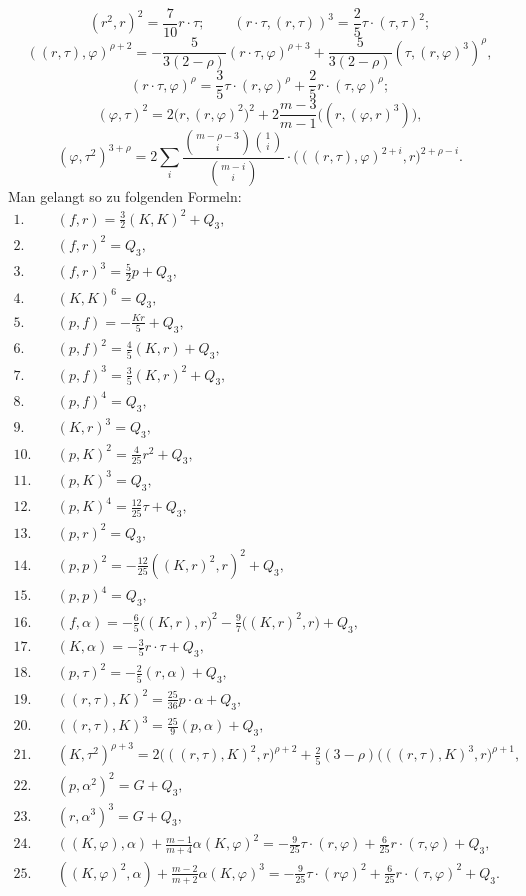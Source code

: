 \documentclass[10pt]{article}
\begin{document}
\[
(r^2,r)^2=\frac7{10}r\cdot\tau;
\qquad (r\cdot\tau,(r,\tau))^3=\frac25\tau\cdot(\tau,\tau)^2;
\]
\[
((r,\tau),\varphi)^{\rho+2}=-\frac5{3(2-\rho)}(r\cdot\tau,\varphi)^{\rho+3}+\frac5{3(2-\rho)}(\tau,(r,\varphi)^3)^\rho,
\]
\[
(r\cdot\tau,\varphi)^\rho=\frac35\tau\cdot(r,\varphi)^\rho+\frac25r\cdot(\tau,\varphi)^\rho;
\]
\[
(\varphi,\tau)^2=2\bigl(r,(r,\varphi)^2\bigr)^2+2\frac{m-3}{m-1}\bigl((r,(\varphi,r)^3)\bigr),
\]
\[
(\varphi,\tau^2)^{3+\rho}=2\sum_i\frac{\binom{m-\rho-3}{i}\binom{1}{i}}{\binom{m-i}{i}}\cdot\bigl(((r,\tau),\varphi)^{2+i},r\bigr)^{2+\rho-i}.
\]
Man gelangt so zu folgenden Formeln:
\begin{align*}
1.\quad &(f,r)=\frac32(K,K)^2+Q_3,\\
2.\quad &(f,r)^2=Q_3,\\
3.\quad &(f,r)^3=\frac52p+Q_3,\\
4.\quad &(K,K)^6=Q_3,\\
5.\quad &(p,f)=-\frac{Kr}{5}+Q_3,\\
6.\quad &(p,f)^2=\frac45(K,r)+Q_3,\\
7.\quad &(p,f)^3=\frac35(K,r)^2+Q_3,\\
8.\quad &(p,f)^4=Q_3,\\
9.\quad &(K,r)^3=Q_3,\\
10.\quad &(p,K)^2=\frac4{25}r^2+Q_3,\\
11.\quad &(p,K)^3=Q_3,\\
12.\quad &(p,K)^4=\frac{12}{25}\tau+Q_3,\\
13.\quad &(p,r)^2=Q_3,\\
14.\quad &(p,p)^2=-\frac{12}{25}((K,r)^2,r)^2+Q_3,\\
15.\quad &(p,p)^4=Q_3,\\
16.\quad &(f,\alpha)=-\frac65\bigl((K,r),r\bigr)^2-\frac97\bigl((K,r)^2,r\bigr)+Q_3,\\
17.\quad &(K,\alpha)=-\frac35r\cdot\tau+Q_3,\\
18.\quad &(p,\tau)^2=-\frac25(r,\alpha)+Q_3,\\
19.\quad &((r,\tau),K)^2=\frac{25}{36}p\cdot\alpha+Q_3,\\
20.\quad &((r,\tau),K)^3=\frac{25}{9}(p,\alpha)+Q_3,\\
21.\quad &(K,\tau^2)^{\rho+3}=2\bigl(((r,\tau),K)^2,r\bigr)^{\rho+2}+\frac25(3-\rho)\bigl(((r,\tau),K)^3,r\bigr)^{\rho+1},\\
22.\quad &(p,\alpha^2)^2=G+Q_3,\\
23.\quad &(r,\alpha^3)^3=G+Q_3,\\
24.\quad &((K,\varphi),\alpha)+\frac{m-1}{m+4}\alpha(K,\varphi)^2=-\frac9{25}\tau\cdot(r,\varphi)+\frac6{25}r\cdot(\tau,\varphi)+Q_3,\\
25.\quad &((K,\varphi)^2,\alpha)+\frac{m-2}{m+2}\alpha(K,\varphi)^3=-\frac9{25}\tau\cdot(r\varphi)^2+\frac6{25}r\cdot(\tau,\varphi)^2+Q_3.
\end{align*}
\end{document}
